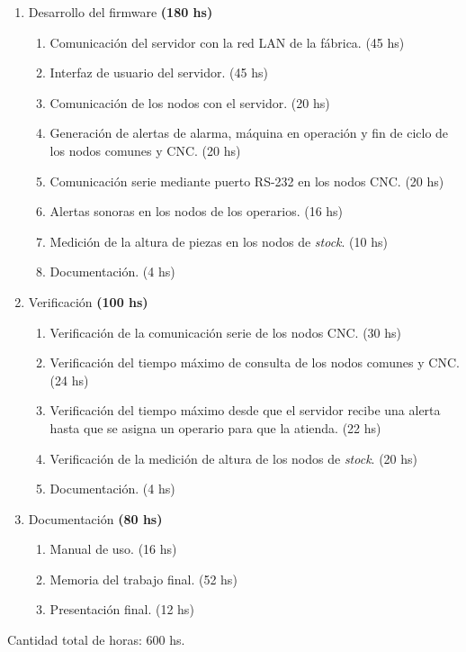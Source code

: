 \documentclass[11pt]{charter}
\begin{document}
\begin{enumerate}
\begin{enumerate}
    \end{enumerate}
    \item Desarrollo del firmware \textbf{(180 hs)}
    \begin{enumerate}
        \item Comunicación del servidor con la red LAN de la fábrica. (45 hs)
        \item Interfaz de usuario del servidor. (45 hs)
        \item Comunicación de los nodos con el servidor. (20 hs)
        \item Generación de alertas de alarma, máquina en operación y fin de ciclo de los nodos comunes y CNC. (20 hs)
        \item Comunicación serie mediante puerto RS-232 en los nodos CNC. (20 hs)
        \item Alertas sonoras en los nodos de los operarios. (16 hs)
        \item Medición de la altura de piezas en los nodos de \textit{stock}. (10 hs)
        \item Documentación. (4 hs)
    \end{enumerate}
    \item Verificación \textbf{(100 hs)}
    \begin{enumerate}
        \item Verificación de la comunicación serie de los nodos CNC. (30 hs)
        \item Verificación del tiempo máximo de consulta de los nodos comunes y CNC. (24 hs)
        \item Verificación del tiempo máximo desde que el servidor recibe una alerta hasta que se asigna un operario para que la atienda. (22 hs)
        \item Verificación de la medición de altura de los nodos de \textit{stock}. (20 hs)
        \item Documentación. (4 hs)
    \end{enumerate}
    \item Documentación \textbf{(80 hs)}
    \begin{enumerate}
        \item Manual de uso. (16 hs)
        \item Memoria del trabajo final. (52 hs)
        \item Presentación final. (12 hs)
    \end{enumerate}
\end{enumerate}

Cantidad total de horas: 600 hs.
\end{document}
